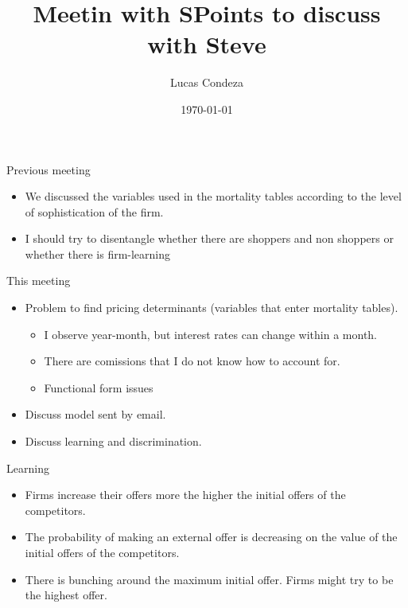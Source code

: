 \documentclass[10pt,aspectratio=169]{beamer}
\title{Meetin with SPoints to discuss with Steve}
\author{%
 Lucas Condeza
\inst{1} \and
}
\institute{
  \inst{1} Yale University \\
}
\date{\today}
\begin{document}




\begin{frame}{Previous meeting}
\begin{itemize}
        \item We discussed the variables used in the mortality tables according to the level of sophistication of the firm. 
 
        \item I should try to disentangle whether there are shoppers and non shoppers or whether there is firm-learning       

\end{itemize}
\end{frame}


\begin{frame}{This meeting}
\begin{itemize}
        \item Problem to find pricing determinants (variables that enter mortality tables). 
     \begin{itemize}
            \item I observe year-month, but interest rates can change within a month. 
            \item There are comissions that I do not know how to account for. 
            \item Functional form issues
        \end{itemize}
        \item Discuss model sent by email. 
        
        \item Discuss learning and discrimination. 
\end{itemize}
\end{frame}
 


\begin{frame}{Learning}
\begin{itemize}
        \item Firms increase their offers more the higher the initial offers of the competitors. 
        
        
        \item The probability of making an external offer is decreasing on the value of the initial offers of the competitors. 
        
        \item There is bunching around the maximum initial offer. Firms might try to be the highest offer.  
\end{itemize}
\end{frame}
 
\end{document}
